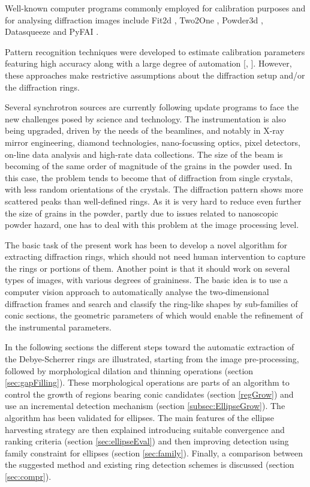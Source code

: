 \documentclass[preprint]{iucr}              %
\begin{document}
Well-known computer programs commonly employed for calibration purposes and for 
analysing diffraction images include Fit2d \cite{hammersley2016fit2d}, Two2One
\cite{vogel2005two2one}, Powder3d \cite{hinrichsen2006powder3d}, Datasqueeze
\cite{heiney2005software} and PyFAI \cite{kieffer2013pyfai}. 

Pattern recognition techniques were developed to estimate calibration parameters
featuring high accuracy along with a large degree of automation
[\cite{rajiv2007automatic}, \cite{cervellino2006folding}].  
However, these approaches make restrictive assumptions about the diffraction
setup and/or the diffraction rings. 

Several synchrotron sources are currently following update programs to face the
new challenges posed by science and technology.  
The instrumentation is also being upgraded, driven by the needs of the beamlines, 
and notably in X-ray mirror engineering, diamond technologies, nano-focussing 
optics, pixel detectors, on-line data analysis and high-rate data collections. 
The size of the beam is becoming of the same order of magnitude of the grains in
the powder used. 
In this case, the problem tends to become that of diffraction from single
crystals, with less random orientations of the crystals. 
The diffraction pattern shows more scattered peaks than well-defined rings. 
As it is very hard to reduce even further the size of grains in the powder,
partly due to issues related to nanoscopic powder hazard, one has to deal with
this problem at the image processing level.  

The basic task of the present work has been to develop a novel algorithm for
extracting diffraction rings, which should not need human intervention to
capture the rings or portions of them.  
Another point is that it should work on several types of images, with various
degrees of graininess. 
The basic idea is to use a computer vision approach to automatically analyse the
two-dimensional diffraction frames and search and classify the ring-like shapes
by sub-families of conic sections, the geometric parameters of which would
enable the refinement of the instrumental parameters.   

In the following sections the different steps toward the automatic extraction of
the Debye-Scherrer rings are illustrated, starting from the image
pre-processing, followed by morphological dilation and thinning operations
(section \ref{sec:gapFilling}).   
These morphological operations are parts of an algorithm to control the growth
of regions bearing conic candidates (section \ref{regGrow}) and use an
incremental detection mechanism (section \ref{subsec:EllipseGrow}).  
The algorithm has been validated for ellipses. 
The main features of the ellipse harvesting strategy are then explained
introducing suitable convergence and ranking criteria (section
\ref{sec:ellipseEval}) and then improving detection using family constraint for
ellipses (section \ref{sec:family}).   
Finally, a comparison between the suggested method and existing ring detection
schemes is discussed (section \ref{sec:compr}). 
\end{document}
